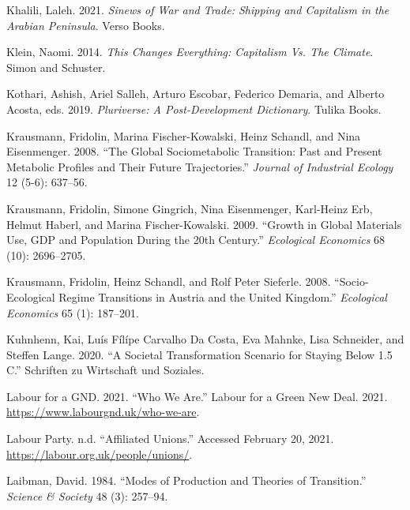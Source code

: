 \documentclass[a4paper, nobind]{templates/ociamthesis}
\newlength{\cslhangindent}
\newenvironment{CSLReferences}[2] %
 {%
  \setlength{\parindent}{0pt}
  \ifodd #1
  \let\oldpar\par
  \def\par{\hangindent=\cslhangindent\oldpar}
  \fi
  \setlength{\parskip}{1mm}
  \setlength{\baselineskip}{6mm}
 }%
 {}
\begin{document}
\begin{CSLReferences}{1}{0}
\leavevmode{}%
Khalili, Laleh. 2021. \emph{Sinews of {War} and {Trade}: {Shipping} and {Capitalism} in the {Arabian Peninsula}}. {Verso Books}.

\leavevmode{}%
Klein, Naomi. 2014. \emph{This {Changes Everything}: {Capitalism Vs}. {The Climate}}. {Simon and Schuster}.

\leavevmode{}%
Kothari, Ashish, Ariel Salleh, Arturo Escobar, Federico Demaria, and Alberto Acosta, eds. 2019. \emph{Pluriverse: {A Post-Development Dictionary}}. {Tulika Books}.

\leavevmode{}%
Krausmann, Fridolin, Marina Fischer-Kowalski, Heinz Schandl, and Nina Eisenmenger. 2008. {``The Global Sociometabolic Transition: Past and Present Metabolic Profiles and Their Future Trajectories.''} \emph{Journal of Industrial Ecology} 12 (5-6): 637--56.

\leavevmode{}%
Krausmann, Fridolin, Simone Gingrich, Nina Eisenmenger, Karl-Heinz Erb, Helmut Haberl, and Marina Fischer-Kowalski. 2009. {``Growth in Global Materials Use, {GDP} and Population During the 20th Century.''} \emph{Ecological Economics} 68 (10): 2696--2705.

\leavevmode{}%
Krausmann, Fridolin, Heinz Schandl, and Rolf Peter Sieferle. 2008. {``Socio-Ecological Regime Transitions in {Austria} and the {United Kingdom}.''} \emph{Ecological Economics} 65 (1): 187--201.

\leavevmode{}%
Kuhnhenn, Kai, Luís Fílípe Carvalho Da Costa, Eva Mahnke, Lisa Schneider, and Steffen Lange. 2020. {``A Societal Transformation Scenario for Staying Below 1.5 {C}.''} {Schriften zu Wirtschaft und Soziales}.

\leavevmode{}%
Labour for a GND. 2021. {``Who {We Are}.''} {Labour for a Green New Deal}. 2021. \url{https://www.labourgnd.uk/who-we-are}.

\leavevmode{}%
Labour Party. n.d. {``Affiliated {Unions}.''} Accessed February 20, 2021. \url{https://labour.org.uk/people/unions/}.

\leavevmode{}%
Laibman, David. 1984. {``Modes of {Production} and {Theories} of {Transition}.''} \emph{Science \& Society} 48 (3): 257--94.


\end{CSLReferences}
\end{document}
